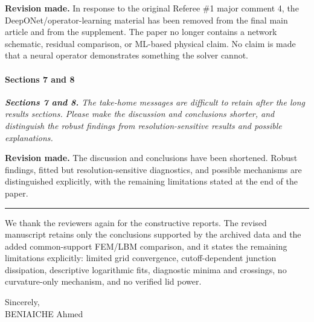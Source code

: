 \documentclass[11pt,a4paper]{article}
\newcommand{\qcomment}[1]{\textcolor{deepblue}{\itshape #1}}
\newcommand{\revwork}[1]{\textbf{\textcolor{revgreen}{#1}}}
\newcommand{\ruleline}{\begin{center}\rule{0.6\textwidth}{0.6pt}\end{center}}
\begin{document}
\noindent\revwork{Revision made.} In response to the original Referee \#1 major comment 4, the DeepONet/operator-learning material has been removed from the final main article and from the supplement. The paper no longer contains a network schematic, residual comparison, or ML-based physical claim. No claim is made that a neural operator demonstrates something the solver cannot.

\medskip
\paragraph{Sections 7 and 8}

\medskip
\noindent\qcomment{\textbf{Sections 7 and 8.} The take-home messages are difficult to retain after the long results sections. Please make the discussion and conclusions shorter, and distinguish the robust findings from resolution-sensitive results and possible explanations.}

\noindent\revwork{Revision made.} The discussion and conclusions have been shortened. Robust findings, fitted but resolution-sensitive diagnostics, and possible mechanisms are distinguished explicitly, with the remaining limitations stated at the end of the paper.

\bigskip
\ruleline

We thank the reviewers again for the constructive reports. The revised manuscript retains only the conclusions supported by the archived data and the added common-support FEM/LBM comparison, and it states the remaining limitations explicitly: limited grid convergence, cutoff-dependent junction dissipation, descriptive logarithmic fits, diagnostic minima and crossings, no curvature-only mechanism, and no verified lid power.

\vspace{3mm}
\noindent Sincerely,\\[1mm]
BENIAICHE Ahmed
\end{document}
